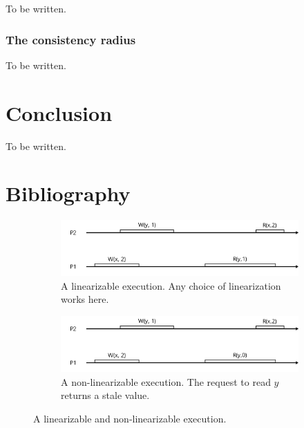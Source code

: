 \documentclass[]             %
{NASA}                       %
\theoremstyle{definition}
\begin{document}
To be written.

\hypertarget{the-consistency-radius}{%
  \subsubsection{The consistency radius}\label{the-consistency-radius}}

To be written.

\hypertarget{conclusion}{%
  \section{Conclusion}\label{conclusion}}

\label{sec:conclusion}

To be written.

\section*{Bibliography}\label{bibliography}





\begin{figure}[p]
  \begin{subfigure}[a]{1\textwidth} \center
    \includegraphics[scale=0.4]{images/linear1.png} \caption{A
      linearizable execution. Any choice of linearization works here.}
    \label{fig:linear_example11} \end{subfigure}
  \begin{subfigure}[b]{1\textwidth} \center
    \includegraphics[scale=0.4]{images/nonlinear0.png} \caption{A
      non-linearizable execution. The request to read $y$ returns a
      stale value. } \label{fig:linear_example12} \end{subfigure}
  \caption{A linearizable and non-linearizable execution.}
  \label{fig:linear_example1} \end{figure}
\end{document}
